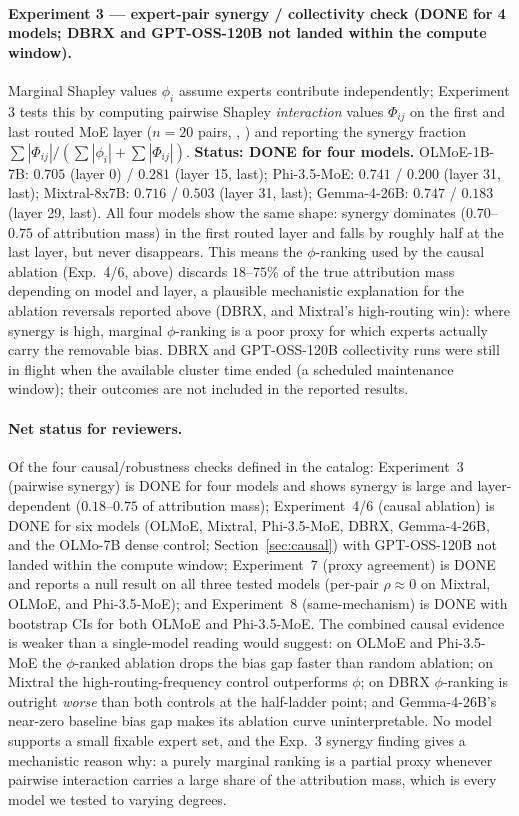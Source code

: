 \documentclass[sigconf]{acmart}
\begin{document}
\paragraph{Experiment 3 --- expert-pair synergy / collectivity check
(DONE for 4 models; DBRX and GPT-OSS-120B not landed within the compute
window).}
Marginal Shapley values $\phi_i$ assume experts contribute independently;
Experiment 3 tests this by computing pairwise Shapley \emph{interaction}
values $\Phi_{ij}$ on the first and last routed MoE layer ($n{=}20$ pairs,
,
) and reporting the
synergy fraction $\sum|\Phi_{ij}|/(\sum|\phi_i|+\sum|\Phi_{ij}|)$.
\textbf{Status: DONE for four models.} OLMoE-1B-7B: $0.705$ (layer 0) /
$0.281$ (layer 15, last); Phi-3.5-MoE: $0.741$ / $0.200$ (layer 31,
last); Mixtral-8x7B: $0.716$ / $0.503$ (layer 31, last); Gemma-4-26B:
$0.747$ / $0.183$ (layer 29, last). All four models show the same
shape: synergy dominates ($0.70$--$0.75$ of attribution mass) in the
first routed layer and falls by roughly half at the last layer, but
never disappears. This means the $\phi$-ranking used by the causal
ablation (Exp.~4/6, above) discards $18$--$75\%$ of the true attribution
mass depending on model and layer, a plausible mechanistic explanation
for the ablation reversals reported above (DBRX, and Mixtral's
high-routing win): where synergy is high, marginal $\phi$-ranking is a
poor proxy for which experts actually carry the removable bias.
DBRX and GPT-OSS-120B collectivity runs were still in flight when the
available cluster time ended (a scheduled maintenance window); their
outcomes are not included in the reported results.

\paragraph{Net status for reviewers.}
Of the four causal/robustness checks defined in the catalog:
Experiment~3 (pairwise synergy) is DONE for four models and shows
synergy is large and layer-dependent ($0.18$--$0.75$ of attribution
mass); Experiment~4/6 (causal ablation) is DONE for six models (OLMoE,
Mixtral, Phi-3.5-MoE, DBRX, Gemma-4-26B, and the OLMo-7B dense control;
Section~\ref{sec:causal}) with GPT-OSS-120B not landed within the
compute window; Experiment~7 (proxy
agreement) is DONE and reports a null result on all three tested models
(per-pair $\rho \approx 0$ on Mixtral, OLMoE, and Phi-3.5-MoE); and
Experiment~8 (same-mechanism) is DONE with bootstrap CIs for both
OLMoE and Phi-3.5-MoE. The combined causal
evidence is weaker than a
single-model reading would suggest: on OLMoE and Phi-3.5-MoE the
$\phi$-ranked ablation drops the bias gap faster than random ablation;
on Mixtral the high-routing-frequency control outperforms $\phi$; on
DBRX $\phi$-ranking is outright \emph{worse} than both controls at the
half-ladder point; and Gemma-4-26B's near-zero baseline bias gap makes
its ablation curve uninterpretable. No model supports a small fixable
expert set, and the Exp.~3 synergy finding gives a mechanistic reason
why: a purely marginal ranking is a partial proxy whenever pairwise
interaction carries a large share of the attribution mass, which is
every model we tested to varying degrees.
\end{document}
